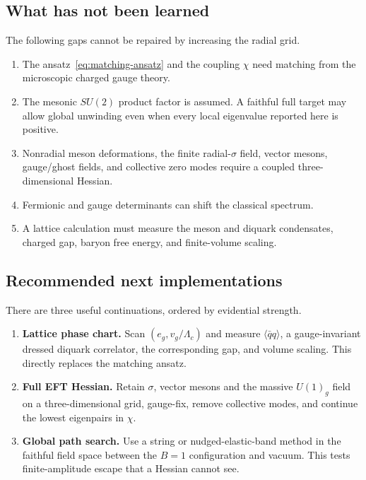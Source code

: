 \documentclass[11pt]{article}
\theoremstyle{definition}
\theoremstyle{remark}
\begin{document}
\subsection{What has not been learned}

The following gaps cannot be repaired by increasing the radial grid.
\begin{enumerate}
\item The ansatz~\eqref{eq:matching-ansatz} and the coupling \(\chi\) need
  matching from the microscopic charged gauge theory.
\item The mesonic \(SU(2)\) product factor is assumed.  A faithful full target
  may allow global unwinding even when every local eigenvalue reported here
  is positive.
\item Nonradial meson deformations, the finite radial-\(\sigma\) field,
  vector mesons, gauge/ghost fields, and collective zero modes require a
  coupled three-dimensional Hessian.
\item Fermionic and gauge determinants can shift the classical spectrum.
\item A lattice calculation must measure the meson and diquark condensates,
  charged gap, baryon free energy, and finite-volume scaling.
\end{enumerate}

\subsection{Recommended next implementations}

There are three useful continuations, ordered by evidential strength.
\begin{enumerate}
\item \textbf{Lattice phase chart.}  Scan \((e_g,v_g/\Lambda_c)\) and measure
  \(\langle\bar qq\rangle\), a gauge-invariant dressed diquark correlator,
  the corresponding gap, and volume scaling.  This directly replaces the
  matching ansatz.
\item \textbf{Full EFT Hessian.}  Retain \(\sigma\), vector mesons and the
  massive \(U(1)_g\) field on a three-dimensional grid, gauge-fix, remove
  collective modes, and continue the lowest eigenpairs in \(\chi\).
\item \textbf{Global path search.}  Use a string or nudged-elastic-band method
  in the faithful field space between the \(B=1\) configuration and vacuum.
  This tests finite-amplitude escape that a Hessian cannot see.
\end{enumerate}
\end{document}
